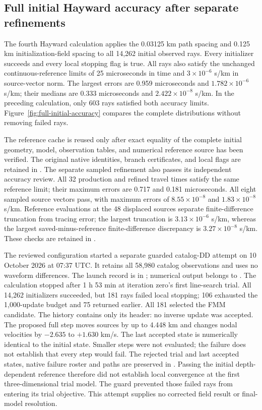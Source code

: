 \subsection{Full initial Hayward accuracy after separate refinements}
The fourth Hayward calculation applies the 0.03125 km path spacing and
0.125 km initialization-field spacing to all 14,262 initial observed rays.
Every initializer succeeds and every local stopping flag is true. All rays
also satisfy the unchanged continuous-reference limits of 25 microseconds
in time and $3\times10^{-6}$ s/km in source-vector norm. The largest errors
are 0.959 microseconds and $1.782\times10^{-6}$ s/km; their medians are
0.333 microseconds and $2.422\times10^{-8}$ s/km. In the preceding calculation,
only 603 rays satisfied both accuracy limits. Figure~\ref{fig:full-initial-accuracy}
compares the complete distributions without removing failed rays.

The reference cache is reused only after exact equality of the complete
initial geometry, model, observation tables, and numerical reference source
has been verified. The original native identities, branch certificates,
and local flags are retained in
.
The separate sampled refinement also passes its independent accuracy review.
All 32 production and refined travel times satisfy the same reference limit;
their maximum errors are 0.717 and 0.181 microseconds. All eight sampled
source vectors pass, with maximum errors of $8.55\times10^{-8}$ and
$1.83\times10^{-8}$ s/km. Reference evaluations at the 48 displaced sources
separate finite-difference truncation from tracing error; the largest
truncation is $3.13\times10^{-6}$ s/km, whereas the largest saved-minus-reference
finite-difference discrepancy is $3.27\times10^{-8}$ s/km.
These checks are retained in
.

The reviewed configuration started a separate guarded catalog-DD attempt on
10 October 2026 at 07:37 UTC. It retains all 58,980 catalog observations and
uses no waveform differences. The launch record is in
; numerical output
belongs to . The calculation stopped
after 1 h 53 min at iteration zero's first line-search trial. All 14,262
initializers succeeded, but 181 rays failed local stopping; 106 exhausted
the 1,000-update budget and 75 returned earlier. All 181 selected the FMM
candidate. The history contains only its header: no inverse update was
accepted. The proposed full step moves sources by up to 4.448 km and changes
nodal velocities by $-2.635$ to $+1.630$ km/s. The last accepted state is
numerically identical to the initial state. Smaller steps were not evaluated;
the failure does not establish that every step would fail. The rejected trial
and last accepted states, native failure roster
and paths are preserved in
.
Passing the initial depth-dependent reference therefore did not establish
local convergence at the first three-dimensional trial model. The guard
prevented those failed rays from entering its trial objective. This attempt
supplies no corrected field result or final-model resolution.

